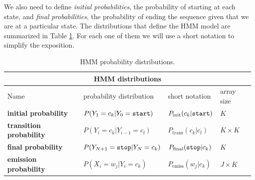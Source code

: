 We also need to define \emph{initial probabilities}, the probability of starting 
at each state, and 
\emph{final probabilities}, the probability of ending the sequence given that we are at a particular state.
 The
distributions that define the HMM model are summarized in Table
\ref{tab:hmm-dist}. 
For each one
of them we will use a short notation to simplify the exposition.
\begin{table}[h]
\begin{center}
\begin{tabular}{|l|l|l|l|}
\hline
\multicolumn{4}{|c|}{HMM distributions}\\
\hline
Name & probability distribution & short notation & array size\\
\hline
\textbf{initial probability} & $P(Y_1 = c_k | Y_0 = \text{\tt start})$ & $P_{\mathrm{init}}(c_k|\text{\tt start})$ & $K$ \\
\hline
\textbf{transition probability} & $P(Y_{i}=c_k|Y_{i-1} = c_l)$ & $P_{\mathrm{trans}}(c_k|c_l)$ & $K\times K$\\
\hline
\textbf{final probability} & $P(Y_{N+1} = \text{\tt stop} | Y_N = c_k)$ & $P_{\mathrm{final}}(\text{\tt stop}|c_k)$ & $K$\\
\hline
\textbf{emission probability} & $P(X_i=w_j| Y_i = c_k)$ & $P_{\mathrm{emiss}}(w_j|c_k)$ & $J \times K$ \\
\hline
\end{tabular}
\end{center}
\caption[HMM probability distributions]{\label{tab:hmm-dist} HMM probability distributions.}
\end{table}

